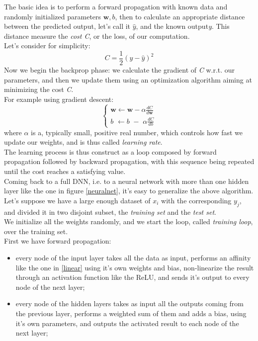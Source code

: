 \documentclass[12pt, a4paper]{report}
\theoremstyle{definition}
\begin{document}
{The basic idea is to perform a forward propagation with known data and randomly initialized parameters $\bm w,b$, then to calculate an appropriate distance between the predicted output, let's call it $\hat y$, and the known output\textit{y}.
This distance measure the \textit{cost C}, or the loss, of our computation.\\
Let's consider for simplicity:
\[
C=\frac{1}{2}(y-\hat y)^2
\]
Now we begin the backprop phase: we calculate the gradient of \textit{C} w.r.t. our parameters, and then we update them using an optimization algorithm aiming at minimizing the cost \textit{C}.\\
For example using gradient descent:
\begin{equation}\label{grad_desc}
\begin{cases}
\bm w \leftarrow \bm w - \alpha \frac{dC}{d\bm w} \\
b \,\,\leftarrow b\,\, - \,\,\alpha \frac{dC}{db}
\end{cases}
\end{equation}
where $\alpha$ is a, typically small, positive real number, which controls how fast we update our weights, and is thus called \textit{learning rate}.\\
The learning process is thus construct as a loop composed by forward propagation followed by backward propagation, with this sequence being repeated until the cost reaches a satisfying value.\\
Coming back to a full DNN, i.e. to a neural network with more than one hidden layer like the one in figure \ref{neuralnet}, it's easy to generalize the above algorithm.\\
Let's suppose we have a large enough dataset of $x_i$ with the corresponding $y_j$, and divided it in two disjoint subset, the \textit{training set} and the \textit{test set}.\\
We initialize all the weights randomly, and we start the loop, called \textit{training loop}, over the training set.\\
First we have forward propagation:
\begin{itemize}
\item every node of the input layer takes all the data as input, performs an affinity like the one in \eqref{linear} using it's own weights and bias, non-linearize the result through an activation function like the ReLU, and sends it's output to every node of the next layer;
\item every node of the hidden layers takes as input all the outputs coming from the previous layer, performs a weighted sum of them and adds a bias, using it's own parameters, and outputs the activated result to each node of the next layer;

\end{itemize}}
\end{document}
